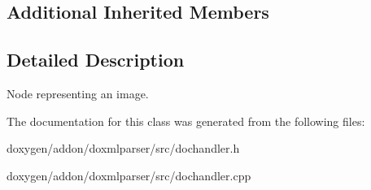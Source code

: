 \subsection*{Additional Inherited Members}


\subsection{Detailed Description}
Node representing an image. 



The documentation for this class was generated from the following files\+:\begin{DoxyCompactItemize}
\item 
doxygen/addon/doxmlparser/src/dochandler.\+h\item 
doxygen/addon/doxmlparser/src/dochandler.\+cpp\end{DoxyCompactItemize}
